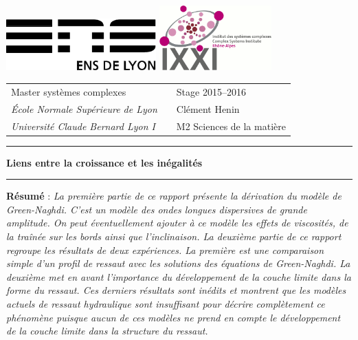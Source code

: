 \documentclass[11pt,a4paper]{article}
\begin{document}
\setlength{\parindent}{0pt}

\thispagestyle{empty}

\includegraphics[height=2cm]{logoens.pdf} \hfill \includegraphics[height=2.5cm]{logo-IXXI.pdf} 

\vspace{0.5cm}

\begin{tabularx}{\textwidth}{@{} l X l @{} }
{\sc Master systèmes complexes} & & Stage 2015--2016 \\
{\it École Normale Supérieure de Lyon} & & Clément Henin \\
{\it Université Claude Bernard Lyon I} & & M2 Sciences de la matière
\end{tabularx}

\begin{center}

\vspace{1.5cm}

\rule[11pt]{5cm}{0.5pt}

\textbf{\huge Liens entre la croissance et les inégalités}

\rule{5cm}{0.5pt}

\vspace{1.5cm}

\end{center}

\parbox{15cm}{\small
\textbf{Résumé} : \it La première partie de ce rapport présente la dérivation du modèle de Green-Naghdi. C'est un modèle des ondes longues dispersives de grande amplitude. On peut éventuellement ajouter à ce modèle les effets de viscosités, de la traînée sur les bords ainsi que l'inclinaison. La deuxième partie de ce rapport regroupe les résultats de deux expériences. La première est une comparaison simple d'un profil de ressaut avec les solutions des équations de Green-Naghdi. La deuxième met en avant l'importance du développement de la couche limite dans la forme du ressaut. Ces derniers résultats sont inédits et montrent que les modèles actuels de ressaut hydraulique sont insuffisant pour décrire complètement ce phénomène puisque aucun de ces modèles ne prend en compte le développement de la couche limite dans la structure du ressaut.

} %
\end{document}
